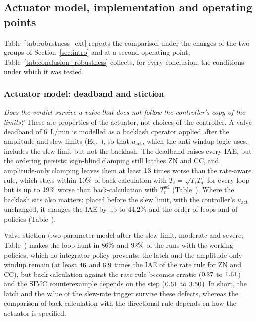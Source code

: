 \subsection{Actuator model, implementation and operating points}
\label{subsec:robustness_ext}
Table~\ref{tab:robustness_ext} repeats the comparison under the changes of the two groups of Section~\ref{sec:intro} and at a second operating point; Table~\ref{tab:conclusion_robustness} collects, for every conclusion, the conditions under which it was tested.

\subsubsection{Actuator model: deadband and stiction}
\label{subsubsec:actuator_model}
\emph{Does the verdict survive a valve that does not follow the controller's copy of the limits?} These are properties of the actuator, not choices of the controller. A valve deadband of $6$~L/min is modelled as a backlash operator applied after the amplitude and slew limits (Eq.~), so that $u_{\text{act}}$, which the anti-windup logic uses, includes the slew limit but not the backlash. The deadband raises every IAE, but the ordering persists: sign-blind clamping still latches ZN and CC, and amplitude-only clamping leaves them at least $13$ times worse than the rate-aware rule, which stays within $10\%$ of back-calculation with $T_t = \sqrt{T_iT_d}$ for every loop but is up to $19\%$ worse than back-calculation with $T_t^{\mathrm{sel}}$ (Table~). Where the backlash sits also matters: placed before the slew limit, with the controller's $u_{\text{act}}$ unchanged, it changes the IAE by up to $44.2\%$ and the order of loops and of policies (Table~).

Valve stiction (two-parameter model \cite{choudhury2005modelling} after the slew limit, moderate and severe; Table~) makes the loop hunt in $86\%$ and $92\%$ of the runs with the working policies, which no integrator policy prevents; the latch and the amplitude-only windup remain (at least $46$ and $6.9$ times the IAE of the rate rule for ZN and CC), but back-calculation against the rate rule becomes erratic ($0.37$ to $1.61$) and the SIMC counterexample depends on the step ($0.61$ to $3.50$). In short, the latch and the value of the slew-rate trigger survive these defects, whereas the comparison of back-calculation with the directional rule depends on how the actuator is specified.

